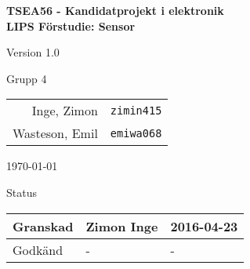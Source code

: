 \documentclass[11pt]{article}
\begin{document}
\begin{titlepage}
\begin{center}

{\Large\bfseries TSEA56 - Kandidatprojekt i elektronik \\ LIPS Förstudie: Sensor}

\vspace{5em}

Version 1.0

\vspace{5em}
Grupp 4 \\
\begin{tabular}{rl}
Inge, Zimon&\verb+zimin415+
\\
Wasteson, Emil&\verb+emiwa068+
\\

\end{tabular}

\vspace{5em}
\today

\vspace{16em}
Status
\begin{longtable}{|l|l|l|} \hline

Granskad & Zimon Inge & 2016-04-23 \\ \hline
Godkänd & - & - \\ \hline
 
\end{longtable}


\end{center}
\end{titlepage}
\end{document}
